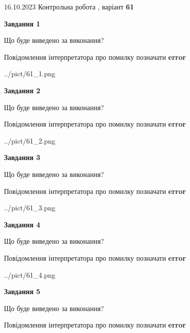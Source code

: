 \documentclass[12pt, ukrainian]{article}
\begin{document}
{\Large{16.10.2023 Контрольна робота , варіант  \No \textbf { 61 }\par}}
{
\begin {large}
{\begin {center}\textbf{Завдання 1}\end {center}}\par
Що буде виведено за виконання? \par
Повідомлення інтерпретатора про помилку позначати \textbf{error}

\begin{center}
	{../pict/61_1.png}
\end{center}
\newpage

{\begin {center}\textbf{Завдання 2}\end {center}}\par
Що буде виведено за виконання? \par
Повідомлення інтерпретатора про помилку позначати \textbf{error}

\begin{center}
	{../pict/61_2.png}
\end{center}
\newpage

{\begin {center}\textbf{Завдання 3}\end {center}}\par
Що буде виведено за виконання? \par
Повідомлення інтерпретатора про помилку позначати \textbf{error}

\begin{center}
	{../pict/61_3.png}
\end{center}
\newpage

{\begin {center}\textbf{Завдання 4}\end {center}}\par
Що буде виведено за виконання? \par
Повідомлення інтерпретатора про помилку позначати \textbf{error}

\begin{center}
	{../pict/61_4.png}
\end{center}
\newpage

{\begin {center}\textbf{Завдання 5}\end {center}}\par
Що буде виведено за виконання? \par
Повідомлення інтерпретатора про помилку позначати \textbf{error}


\end{large}}
\end{document}
